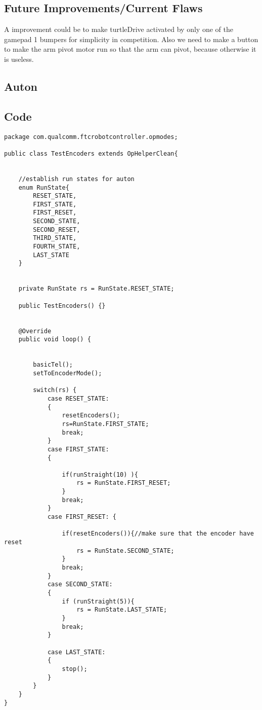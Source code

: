 \documentclass[11pt,fleqn]{article}
\begin{document}
\subsection*{Future Improvements/Current Flaws}

A improvement could be to make turtleDrive activated by only one of the gamepad 1 bumpers for
simplicity in competition. Also we need to make a button to make the arm pivot motor run so that the
arm can pivot, because otherwise it is useless.

\begin{center}
\section*{Auton}
\end{center}

\subsection*{Code}
\begin{verbatim}
package com.qualcomm.ftcrobotcontroller.opmodes;

public class TestEncoders extends OpHelperClean{


    //establish run states for auton
    enum RunState{
        RESET_STATE,
        FIRST_STATE,
        FIRST_RESET,
        SECOND_STATE,
        SECOND_RESET,
        THIRD_STATE,
        FOURTH_STATE,
        LAST_STATE
    }


    private RunState rs = RunState.RESET_STATE;

    public TestEncoders() {}


    @Override
    public void loop() {


        basicTel();
        setToEncoderMode();

        switch(rs) {
            case RESET_STATE:
            {
                resetEncoders();
                rs=RunState.FIRST_STATE;
                break;
            }
            case FIRST_STATE:
            {

                if(runStraight(10) ){
                    rs = RunState.FIRST_RESET;
                }
                break;
            }
            case FIRST_RESET: {

                if(resetEncoders()){//make sure that the encoder have reset
                    rs = RunState.SECOND_STATE;
                }
                break;
            }
            case SECOND_STATE:
            {
                if (runStraight(5)){
                    rs = RunState.LAST_STATE;
                }
                break;
            }

            case LAST_STATE:
            {
                stop();
            }
        }
    }
}

\end{verbatim}
\end{document}
